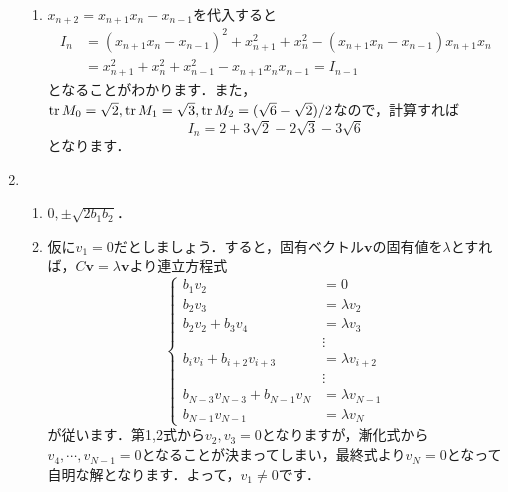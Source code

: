 \documentclass[a4paper,pdflatex,ja=standard]{bxjsarticle}
\begin{document}
\begin{enumerate}
\begin{enumerate}
    \item 
    $x_{n+2}=x_{n+1}x_n-x_{n-1}$を代入すると
    \begin{align}
      I_n
      &=
      (x_{n+1}x_n-x_{n-1})^2
      +
      x_{n+1}^2
      +
      x_n^2
      -
      (x_{n+1}x_n-x_{n-1})x_{n+1}x_n
      \nonumber
      \\
      &=
      x_{n+1}^2+x_n^2+x_{n-1}^2
      -
      x_{n+1}x_nx_{n-1}
      =
      I_{n-1}
    \end{align}
    となることがわかります．また，$\tr M_0=\sqrt{2}, \tr M_1=\sqrt{3}, \tr M_2=(\sqrt{6}-\sqrt{2})/2$なので，計算すれば
    \begin{equation}
      I_n
      =
      2+3\sqrt{2}-2\sqrt{3}-3\sqrt{6}
    \end{equation}
    となります．

  \end{enumerate}

  \item 
  \begin{enumerate}
    \item 
    $0,\pm\sqrt{2b_1b_2}$．

    \item 
    仮に$v_1=0$だとしましょう．すると，固有ベクトル$\bm{v}$の固有値を$\lambda$とすれば，$C\bm{v}=\lambda\bm{v}$より連立方程式
    \begin{equation}
      \left\{
        \begin{alignedat}{1}
          b_1 v_2 &= 0 \\
          b_2 v_3 &= \lambda v_2 \\
          b_2 v_2 + b_3 v_4 &= \lambda v_3 \\
          &\vdots \\
          b_i v_i + b_{i+2} v_{i+3} &= \lambda v_{i+2} \\
          &\vdots \\
          b_{N-3} v_{N-3} + b_{N-1} v_{N} &= \lambda v_{N-1} \\
          b_{N-1} v_{N-1} &= \lambda v_{N}      
        \end{alignedat}
      \right.
    \end{equation}
    が従います．第1,2式から$v_2,v_3=0$となりますが，漸化式から$v_4,\cdots,v_{N-1}=0$となることが決まってしまい，最終式より$v_N=0$となって自明な解となります．よって，$v_1\neq 0$です．


\end{enumerate}
\end{enumerate}
\end{document}
